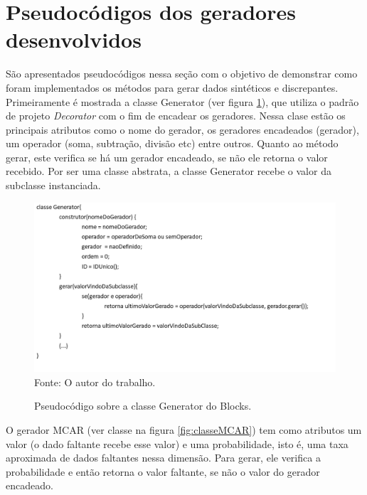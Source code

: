 \documentclass[
	12pt,				%
	openright,			%
	oneside,			%
	a4paper,			%
	english,			%
	brazil				%
	]{abntex2}
\begin{document}
	\section{Pseudocódigos dos geradores desenvolvidos}
		São apresentados pseudocódigos nessa seção com o objetivo de demonstrar como foram implementados os métodos para gerar dados sintéticos e discrepantes.
		Primeiramente é mostrada a classe Generator (ver figura \ref{fig:Generator}), que utiliza o padrão de projeto \emph{Decorator} com o fim de encadear os geradores.
		Nessa clase estão os principais atributos como o nome do gerador, os geradores encadeados (gerador), um operador (soma, subtração, divisão etc) entre outros.
		Quanto ao método gerar, este verifica se há um gerador encadeado, se não ele retorna o valor recebido.
		Por ser uma classe abstrata, a classe Generator recebe o valor da subclasse instanciada.
		\begin{figure}[h!]
			\centering
			\caption{Pseudocódigo sobre a classe Generator do Blocks.}
			\includegraphics[width=\linewidth]{./figures/prototipo/Generator.png}
			\label{fig:Generator}
			\footnotesize Fonte: O autor do trabalho.
		\end{figure}
		\par
		O gerador MCAR (ver classe na figura \ref{fig:classeMCAR}) tem como atributos um valor (o dado faltante recebe esse valor) e uma probabilidade, isto é, uma taxa aproximada de dados faltantes nessa dimensão.
		Para gerar, ele verifica a probabilidade e então retorna o valor faltante, se não o valor do gerador encadeado.
		
\end{document}
